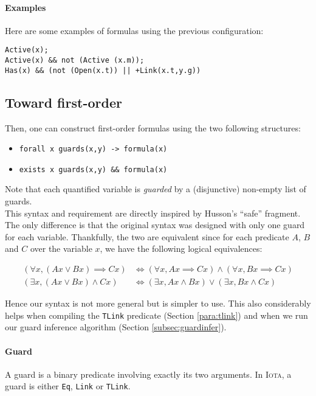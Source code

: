 \documentclass[10pt,a4paper]{article}
\newcommand\Iota{\textsc{Iota}}
\newcommand{\ocaml}{\texttt}
\begin{document}
\paragraph{Examples}
Here are some examples of formulas using the previous configuration:
\begin{verbatim}
Active(x);
Active(x) && not (Active (x.m));
Has(x) && (not (Open(x.t)) || +Link(x.t,y.g))
\end{verbatim}

\subsection{Toward first-order}
Then, one can construct first-order formulas using the two following structures:
\begin{itemize}
\item \ocaml{forall x guards(x,y) -> formula(x)}
\item \ocaml{exists x guards(x,y) && formula(x)}
\end{itemize}
Note that each quantified variable is \emph{guarded} by a (disjunctive) non-empty list of guards.\\
This syntax and requirement are directly inspired by Husson's ``safe'' fragment. The only difference is that the original syntax was designed with only one guard for each variable. Thankfully, the two are equivalent since for each predicate $A$, $B$ and $C$ over the variable $x$, we have the following logical equivalences:

\begin{align*}
  (\forall x, (A x \lor B x) \implies C x) &\iff (\forall x, A x \implies C x) \land (\forall x, B x \implies C x)\\
  (\exists x, (A x \lor B x ) \land C x) &\iff (\exists x, A x \land B x) \lor (\exists x, B x \land C x)
\end{align*}

Hence our syntax is not more general but is simpler to use. This also considerably helps when compiling the \ocaml{TLink} predicate (Section \ref{para:tlink}) and when we run our guard inference algorithm (Section \ref{subsec:guardinfer}).

\paragraph{Guard}
A guard is a binary predicate involving exactly its two arguments. In \Iota{}, a guard is either \ocaml{Eq}, \ocaml{Link} or \ocaml{TLink}.
\end{document}
